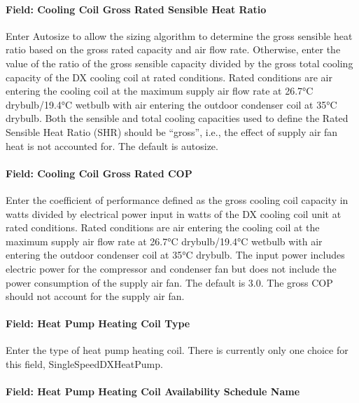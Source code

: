 \paragraph{Field: Cooling Coil Gross Rated Sensible Heat Ratio}\label{field-cooling-coil-gross-rated-sensible-heat-ratio-1}

Enter Autosize to allow the sizing algorithm to determine the gross sensible heat ratio based on the gross rated capacity and air flow rate. Otherwise, enter the value of the ratio of the gross sensible capacity divided by the gross total cooling capacity of the DX cooling coil at rated conditions. Rated conditions are air entering the cooling coil at the maximum supply air flow rate at 26.7°C drybulb/19.4°C wetbulb with air entering the outdoor condenser coil at 35°C drybulb. Both the sensible and total cooling capacities used to define the Rated Sensible Heat Ratio (SHR) should be ``gross'', i.e., the effect of supply air fan heat is not accounted for. The default is autosize.

\paragraph{Field: Cooling Coil Gross Rated COP}\label{field-cooling-coil-gross-rated-cop}

Enter the coefficient of performance defined as the gross cooling coil capacity in watts divided by electrical power input in watts of the DX cooling coil unit at rated conditions. Rated conditions are air entering the cooling coil at the maximum supply air flow rate at 26.7°C drybulb/19.4°C wetbulb with air entering the outdoor condenser coil at 35°C drybulb. The input power includes electric power for the compressor and condenser fan but does not include the power consumption of the supply air fan. The default is 3.0. The gross COP should not account for the supply air fan.

\paragraph{Field: Heat Pump Heating Coil Type}\label{field-heat-pump-heating-coil-type}

Enter the type of heat pump heating coil. There is currently only one choice for this field, SingleSpeedDXHeatPump.

\paragraph{Field: Heat Pump Heating Coil Availability Schedule Name}\label{field-heat-pump-heating-coil-availability-schedule-name}

